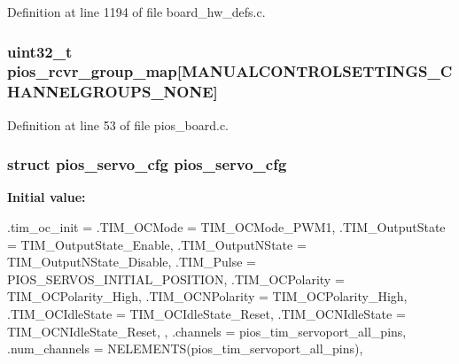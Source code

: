 \-Definition at line 1194 of file board\-\_\-hw\-\_\-defs.\-c.

\hypertarget{group___copter_control_ga6c6cfc16eb738e47c123298e062297e2}{
\subsubsection[{pios\-\_\-rcvr\-\_\-group\-\_\-map}]{\setlength{\rightskip}{0pt plus 5cm}uint32\-\_\-t {\bf pios\-\_\-rcvr\-\_\-group\-\_\-map}\mbox{[}{\bf \-M\-A\-N\-U\-A\-L\-C\-O\-N\-T\-R\-O\-L\-S\-E\-T\-T\-I\-N\-G\-S\-\_\-\-C\-H\-A\-N\-N\-E\-L\-G\-R\-O\-U\-P\-S\-\_\-\-N\-O\-N\-E}\mbox{]}}}\label{group___copter_control_ga6c6cfc16eb738e47c123298e062297e2}


\-Definition at line 53 of file pios\-\_\-board.\-c.

\hypertarget{group___copter_control_ga57a87ef16d7949a9cc3589efc8d88a28}{
\subsubsection[{pios\-\_\-servo\-\_\-cfg}]{\setlength{\rightskip}{0pt plus 5cm}struct {\bf pios\-\_\-servo\-\_\-cfg} {\bf pios\-\_\-servo\-\_\-cfg}}}\label{group___copter_control_ga57a87ef16d7949a9cc3589efc8d88a28}
{\bfseries \-Initial value\-:}
\begin{DoxyCode}
 {
        .tim_oc_init = {
                .TIM_OCMode = TIM_OCMode_PWM1,
                .TIM_OutputState = TIM_OutputState_Enable,
                .TIM_OutputNState = TIM_OutputNState_Disable,
                .TIM_Pulse = PIOS_SERVOS_INITIAL_POSITION,
                .TIM_OCPolarity = TIM_OCPolarity_High,
                .TIM_OCNPolarity = TIM_OCPolarity_High,
                .TIM_OCIdleState = TIM_OCIdleState_Reset,
                .TIM_OCNIdleState = TIM_OCNIdleState_Reset,
        },
        .channels = pios_tim_servoport_all_pins,
        .num_channels = NELEMENTS(pios_tim_servoport_all_pins),
}
\end{DoxyCode}


